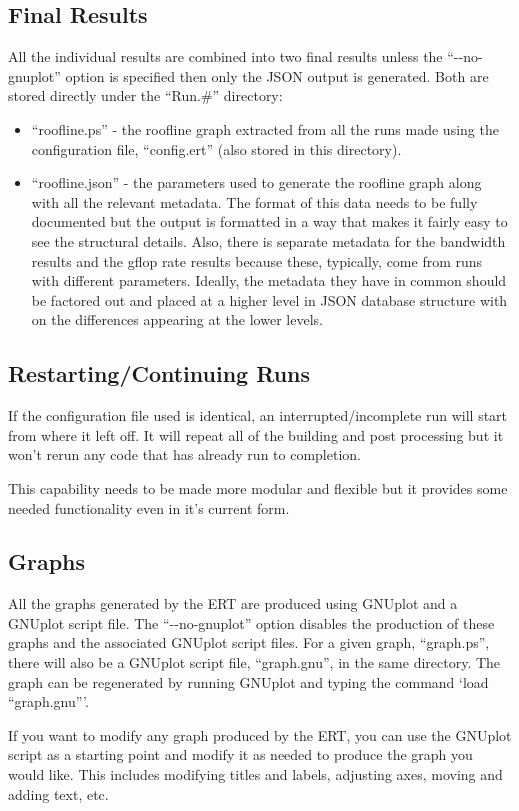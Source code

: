 \subsection{Final Results}
\label{subsection:final_results}

All the individual results are combined into two final results
unless the ``-{}-no-gnuplot'' option is specified then only the JSON output
is generated.
Both are stored directly under the ``Run.\#'' directory:  

\begin{itemize}

\vspace{-0.1in}
\item{``roofline.ps'' - the roofline graph extracted from all the runs made
using the configuration file, ``config.ert'' (also stored in this directory).}

\vspace{-0.1in}
\item{``roofline.json'' - the parameters used to generate the roofline graph
along with all the relevant metadata.  The format of this data needs to be
fully documented but the output is formatted in a way that makes it fairly
easy to see the structural details.  Also, there is separate metadata for the
bandwidth results and the gflop rate results because these, typically, come
from runs with different parameters.  Ideally, the metadata they have in
common should be factored out and placed at a higher level in JSON database
structure with on the differences appearing at the lower levels.}

\end{itemize}

\subsection{Restarting/Continuing Runs}

If the configuration file used is identical, an interrupted/incomplete run
will start from where it left off.  It will repeat all of the building and
post processing but it won't rerun any code that has already run to
completion.

This capability needs to be made more modular and flexible but it provides
some needed functionality even in it's current form.

\subsection{Graphs}

All the graphs generated by the ERT are produced using GNUplot and a GNUplot
script file.
The ``-{}-no-gnuplot'' option disables the production of these graphs and the
associated GNUplot script files.
For a given graph, ``graph.ps'', there will also be a GNUplot
script file, ``graph.gnu'', in the same directory.  The graph can be
regenerated by running GNUplot and typing the command `load ``graph.gnu'''.

If you want to modify any graph produced by the ERT, you can use the GNUplot
script as a starting point and modify it as needed to produce the graph you
would like.  This includes modifying titles and labels, adjusting axes, moving
and adding text, etc.
